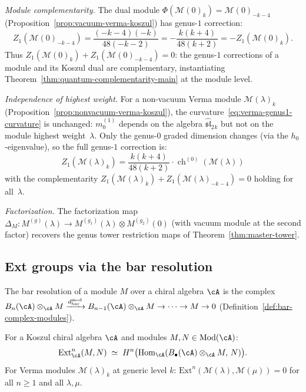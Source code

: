 \begin{example}
\emph{Module complementarity.}
The dual module $\Phi(\mathcal{M}(0)_k) = \mathcal{M}(0)_{-k-4}$
(Proposition~\ref{prop:vacuum-verma-koszul}) has genus-$1$
correction:
\[
Z_1(\mathcal{M}(0)_{-k-4})
= \frac{(-k-4)(-k)}{48(-k-2)}
= -\frac{k(k+4)}{48(k+2)}
= -Z_1(\mathcal{M}(0)_k).
\]
Thus $Z_1(\mathcal{M}(0)_k) + Z_1(\mathcal{M}(0)_{-k-4}) = 0$:
the genus-$1$ corrections of a module and its Koszul dual are
complementary, instantiating Theorem~\ref{thm:quantum-complementarity-main}
at the module level.

\emph{Independence of highest weight.}
For a non-vacuum Verma module $\mathcal{M}(\lambda)_k$
(Proposition~\ref{prop:nonvacuum-verma-koszul}), the
curvature~\eqref{eq:verma-genus1-curvature} is unchanged:
$m_0^{(1)}$ depends on the algebra $\widehat{\mathfrak{sl}}_2{}_k$
but not on the module highest weight~$\lambda$.  Only the
genus-$0$ graded dimension changes (via the $h_0$-eigenvalue),
so the full genus-$1$ correction is:
\[
Z_1(\mathcal{M}(\lambda)_k)
= \frac{k(k+4)}{48(k+2)} \cdot \operatorname{ch}^{(0)}(\mathcal{M}(\lambda))
\]
with the complementarity
$Z_1(\mathcal{M}(\lambda)_k) + Z_1(\mathcal{M}(\lambda)_{-k-4}) = 0$
holding for all~$\lambda$.

\emph{Factorization.}
The factorization map
$\Delta_M\colon M^{(g)}(\lambda) \to
M^{(g_1)}(\lambda) \otimes M^{(g_2)}(0)$
(with vacuum module at the second factor) recovers the genus tower
restriction maps of Theorem~\ref{thm:master-tower}.
\end{example}

\subsection{Ext groups via the bar resolution}
\label{subsec:ext-bar-resolution}

The bar resolution of a module $M$ over a chiral algebra $\cA$ is
the complex
$B_n(\cA) \otimes_\cA M \xrightarrow{d^{\mathrm{mod}}_{\mathrm{bar}}}
B_{n-1}(\cA) \otimes_\cA M \to \cdots \to M \to 0$
(Definition~\ref{def:bar-complex-modules}).

\begin{proposition}
\label{prop:ext-bar-resolution}
For a Koszul chiral algebra $\cA$ and modules $M, N \in \mathrm{Mod}(\cA)$:
\begin{equation}\label{eq:ext-bar-resolution}
\mathrm{Ext}^n_\cA(M, N)
\;\simeq\;
H^n\bigl(\mathrm{Hom}_\cA(B_\bullet(\cA) \otimes_\cA M,\, N)\bigr).
\end{equation}
For Verma modules $\mathcal{M}(\lambda)_k$ at generic level $k$:
$\mathrm{Ext}^n(\mathcal{M}(\lambda), \mathcal{M}(\mu)) = 0$
for all $n \geq 1$ and all $\lambda, \mu$.
\end{proposition}

